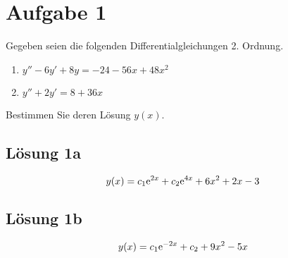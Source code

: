 \documentclass[main.tex]{subfiles}
\begin{document}
\section{Aufgabe 1}
Gegeben seien die folgenden Differentialgleichungen 2. Ordnung.
\begin{enumerate}
    \item $y'' - 6y' + 8y = -24 -56x + 48x^2$
    \item $y'' + 2y' = 8 + 36x$
\end{enumerate}
Bestimmen Sie deren Lösung $y(x)$.

\subsection{Lösung 1a}

$$
    y(x) = c_1 \mathrm{e}^{2 x} + c_2 \mathrm{e}^{4 x} + 6 x^2 + 2 x - 3
$$

\subsection{Lösung 1b}

$$
    y(x) = c_1 \mathrm{e}^{-2 x} + c_2 + 9 x^2 - 5 x
$$
\end{document}
